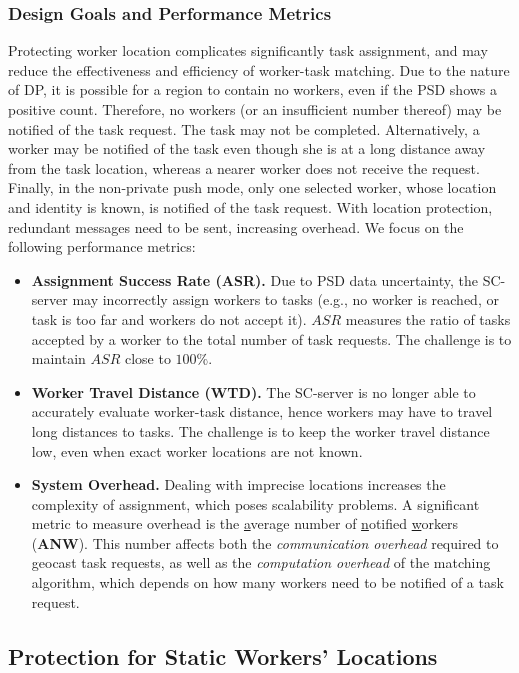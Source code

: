 \documentclass{USC-Thesis}
\renewcommand\bf\bfseries
\numberwithin{equation}{chapter}
\begin{document}
\subsubsection{Design Goals and Performance Metrics}
\label{sec:metrics1}
Protecting worker location complicates significantly task assignment, and may reduce the effectiveness and efficiency of worker-task matching. Due to the nature of DP, it is possible for a region to contain no workers, even if the PSD shows a positive count. Therefore, no workers (or an insufficient number thereof) may be notified of the task request. The task may not be completed. Alternatively, a worker may be notified of the task even though she is at a long distance away from the task location, whereas a nearer worker does not receive the request. 
Finally, in the non-private push mode, only one selected worker, whose location and identity is known, is notified of the task request. 
With location protection, redundant messages need to be sent, increasing overhead.
We focus on the following performance metrics:
\begin{itemize}
\item
{\bf Assignment Success Rate (ASR).} Due to PSD data uncertainty, the SC-server may incorrectly assign workers to tasks (e.g., no worker is reached, or task is too far and workers do not accept it). $\mathit{ASR}$ measures the ratio of tasks accepted by a worker to the total number of task requests. The challenge is to maintain $\mathit{ASR}$ close to $100\%$.
\item
{\bf Worker Travel Distance (WTD).} The SC-server is no longer able to accurately evaluate worker-task distance, hence workers may have to travel long distances to tasks. The challenge is to keep the worker travel distance low, even when exact worker locations are not known.
\item
{\bf System Overhead.} Dealing with imprecise locations increases the complexity of assignment, which poses scalability problems. 
A significant metric to measure overhead is the {\underline a}verage number of {\underline n}otified {\underline w}orkers ({\bf ANW}).
This number affects both the {\em communication overhead} required to geocast task requests, as well as the {\em computation overhead} of the matching algorithm, which depends on how many workers need to be notified of a task request.
\end{itemize}

\subsection{Protection for Static Workers' Locations}
\end{document}
